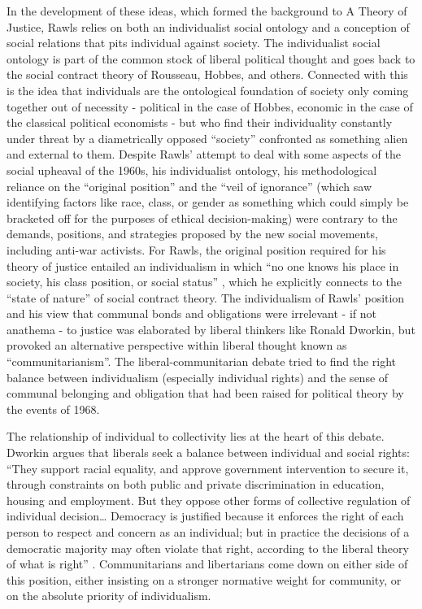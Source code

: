 \documentclass[12pt,oneside]{memoir}
\begin{document}
In the development of these ideas, which formed the background to A Theory of Justice, Rawls relies on both an individualist social ontology and a conception of social relations that pits individual against society. The individualist social ontology is part of the common stock of liberal political thought and goes back to the social contract theory of Rousseau, Hobbes, and others. Connected with this is the idea that individuals are the ontological foundation of society only coming together out of necessity - political in the case of Hobbes, economic in the case of the classical political economists - but who find their individuality constantly under threat by a diametrically opposed ``society'' confronted as something alien and external to them.
Despite Rawls' attempt to deal with some aspects of the social upheaval of the 1960s, his individualist ontology, his methodological reliance on the ``original position'' and the ``veil of ignorance'' (which saw identifying factors like race, class, or gender as something which could simply be bracketed off for the purposes of ethical decision-making) were contrary to the demands, positions, and strategies proposed by the new social movements, including anti-war activists. For Rawls, the original position required for his theory of justice entailed an individualism in which ``no one knows his place in society, his class position, or social status'' \citep[12]{Rawls2005}, which he explicitly connects to the ``state of nature'' of social contract theory. The individualism of Rawls' position and his view that communal bonds and obligations were irrelevant - if not anathema - to justice was elaborated by liberal thinkers like Ronald Dworkin, but provoked an alternative perspective within liberal thought known as ``communitarianism''. The liberal-communitarian debate tried to find the right balance between individualism (especially individual rights) and the sense of communal belonging and obligation that had been raised for political theory by the events of 1968. 

The relationship of individual to collectivity lies at the heart of this debate. Dworkin argues that liberals seek a balance between individual and social rights: ``They support racial equality, and approve government intervention to secure it, through constraints on both public and private discrimination in education, housing and employment. But they oppose other forms of collective regulation of individual decision{\ldots} Democracy is justified because it enforces the right of each person to respect and concern as an individual; but in practice the decisions of a democratic majority may often violate that right, according to the liberal theory of what is right'' \citep[122/134]{Dworkin1978}. Communitarians and libertarians come down on either side of this position, either insisting on a stronger normative weight for community, or on the absolute priority of individualism. 
\end{document}
